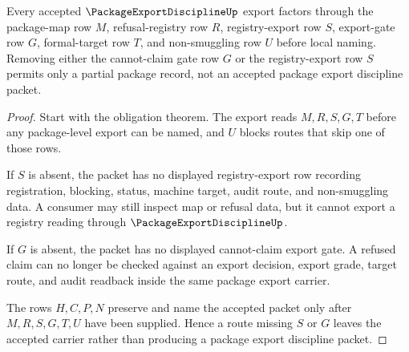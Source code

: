 \begin{theorem}
\label{thm:package-export-discipline-non-smuggling-boundary}
Every accepted $\PackageExportDisciplineUp$ export factors through the package-map row $M$, refusal-registry row $R$, registry-export row $S$, export-gate row $G$, formal-target row $T$, and non-smuggling row $U$ before local naming. Removing either the cannot-claim gate row $G$ or the registry-export row $S$ permits only a partial package record, not an accepted package export discipline packet.
\end{theorem}
\begin{proof}
Start with the obligation theorem. The export reads $M,R,S,G,T$ before any package-level export can be named, and $U$ blocks routes that skip one of those rows.

If $S$ is absent, the packet has no displayed registry-export row recording registration, blocking, status, machine target, audit route, and non-smuggling data. A consumer may still inspect map or refusal data, but it cannot export a registry reading through $\PackageExportDisciplineUp$.

If $G$ is absent, the packet has no displayed cannot-claim export gate. A refused claim can no longer be checked against an export decision, export grade, target route, and audit readback inside the same package export carrier.

The rows $H,C,P,N$ preserve and name the accepted packet only after $M,R,S,G,T,U$ have been supplied. Hence a route missing $S$ or $G$ leaves the accepted carrier rather than producing a package export discipline packet.
\end{proof}

